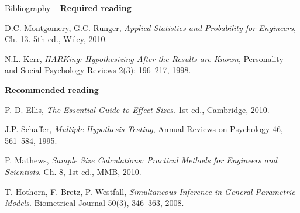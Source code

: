 \documentclass[t]{beamer}
\begin{document}
\begin{ftst}
{Bibliography}
{\ }
\scriptsize
\textbf{Required reading}

\benums  D.C. Montgomery, G.C. Runger, \textit{Applied Statistics and Probability for Engineers}, Ch. 13. 5th ed., Wiley, 2010.
\item N.L. Kerr, \textit{HARKing: Hypothesizing After the Results are Known}, Personality and Social Psychology Reviews 2(3): 196--217, 1998.
\eenum

\textbf{Recommended reading}

\benums P. D. Ellis, \textit{The Essential Guide to Effect Sizes}. 1st ed., Cambridge, 2010.
\item J.P. Schaffer, \textit{Multiple Hypothesis Testing}, Annual Reviews on Psychology 46, 561--584, 1995.
\item P. Mathews, \textit{Sample Size Calculations: Practical Methods for Engineers and Scientists}. Ch. 8, 1st ed., MMB, 2010.
\item T. Hothorn, F. Bretz, P. Westfall, \textit{Simultaneous Inference in General Parametric Models}. Biometrical  Journal 50(3), 346--363, 2008.
\eenum
\end{ftst}



\end{document}
